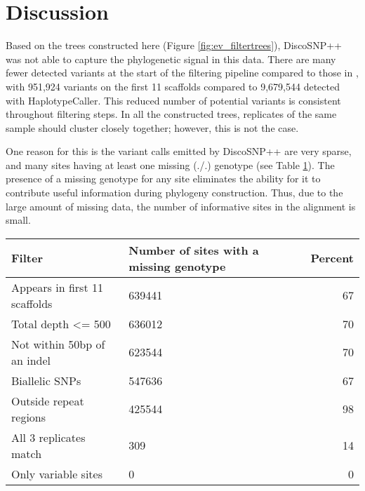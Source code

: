 \section{Discussion}

Based on the trees constructed here (Figure \ref{fig:ev_filtertrees}), DiscoSNP++ was not able to capture the phylogenetic signal in this data. There are many fewer detected variants at the start of the filtering pipeline compared to those in \cite{orr_phylogenomic_2020}, with 951,924 variants on the first 11 scaffolds compared to 9,679,544 detected with HaplotypeCaller. This reduced number of potential variants is consistent throughout filtering steps. In all the constructed trees, replicates of the same sample should cluster closely together; however, this is not the case.

One reason for this is the variant calls emitted by DiscoSNP++ are very sparse, and many sites having at least one missing (./.) genotype (see Table \ref{tbl:ev_missing}). The presence of a missing genotype for any site eliminates the ability for it to contribute useful information during phylogeny construction. Thus, due to the large amount of missing data, the number of informative sites in the alignment is small. 

\begin{table}
\centering
\begin{tabularx}{.8\textwidth}{ l X r }
\toprule
\textbf{Filter} & \textbf{Number of sites with \newline a missing genotype} & \textbf{Percent}\\
\midrule
Appears in first 11 scaffolds & 639441 & 67\\
Total depth <= 500 & 636012 & 70\\
Not within 50bp of an indel & 623544 & 70\\
Biallelic SNPs & 547636 & 67\\
Outside repeat regions & 425544 & 98\\
All 3 replicates match & 309 & 14\\
Only variable sites & 0 & 0\\
\bottomrule
\end{tabularx}
\label{tbl:ev_missing}
\end{table}

